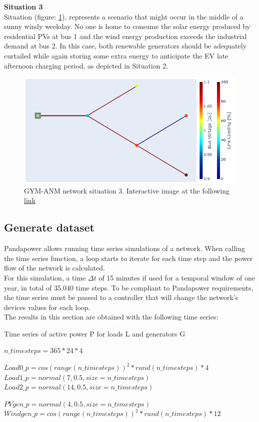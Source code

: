 \noindent \textbf{Situation 3} \\
    Situation (figure: \ref{fig:net_sit3}), represents a scenario that might occur in the middle of a sunny windy weekday. No one is home to consume the solar energy produced by residential PVs at bus 1 and the wind energy production exceeds the industrial demand at bus 2. In this case, both renewable generators should be
    adequately curtailed while again storing some extra energy to anticipate the EV late afternoon charging period, as depicted in Situation 2.
    \begin{figure}[h]
    \centering
        \includegraphics[width=.7\linewidth]{images/GYM-ANM/NETS/Gyn-anm network situation3.png}
    \caption[GYM-ANM network situation 3]{GYM-ANM network situation 3. Interactive image at the following \href{https://htmlpreview.github.io/?https://github.com/MauriVass/ThesisLiege/blob/master/Images/fig_case3.html}{link}}
    \label{fig:net_sit3}
    \end{figure}
    
\subsection{Generate dataset}
Pandapower allows running time series simulations of a network. When calling the time series function, a loop starts to iterate for each time step and the power flow of the network is calculated.\\
For this simulation, a time $\Delta t$ of 15 minutes if used for a temporal window of one year, in total of 35,040 time steps. To be compliant to Pandapower requirements, the time series must be passed to a controller that will change the network's devices values for each loop.\\
The results in this section are obtained with the following time series:

\begin{algorithm}[H]
\caption{Time series of active power \gls{P} for loads \gls{L} and generators \gls{G}}
\label{alg:timeseries}
\begin{algorithmic}[1]
\State $n\_timesteps = 365 * 24 * 4$

\State $Load0\_p = cos(range(n\_timesteps))^2* rand(n\_timesteps)*4$
\State $Load1\_p = normal(7,0.5, size=n\_timesteps)$
\State $Load2\_p = normal(14,0.5, size=n\_timesteps)$

\State $PVgen\_p = normal(4,0.5, size=n\_timesteps)$
\State $Windgen\_p = cos(range(n\_timesteps))^2*rand(n\_timesteps)*12$

\end{algorithmic}
\end{algorithm}


